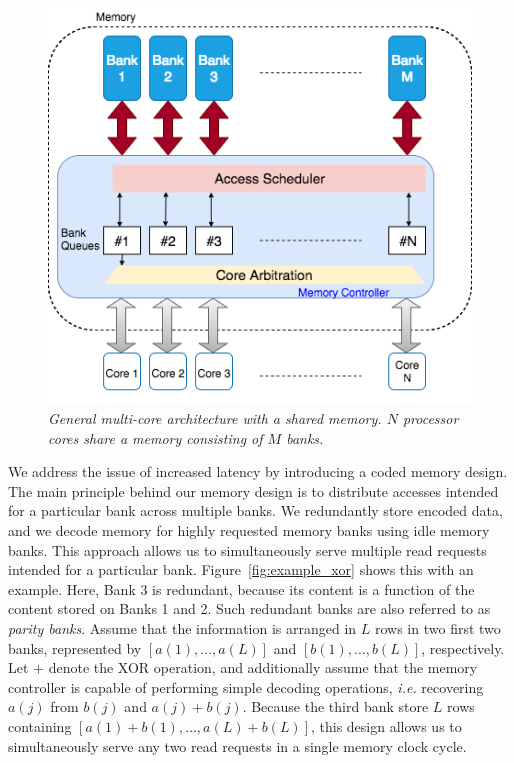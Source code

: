 \begin{figure}[t!]
\centering
\includegraphics[width=\linewidth]{fig/fig-2-memory-controller.png}
\caption{\it{General multi-core architecture with a shared memory. $N$ processor cores share a memory consisting of $M$ banks.}}
\label{fig:multicore_arch}
\end{figure}
We address the issue of increased latency by introducing a coded memory design. The main principle behind our memory design is to distribute accesses intended for a particular bank across multiple banks. We redundantly store encoded data, and we decode memory for highly requested memory banks using idle memory banks. This approach allows us to simultaneously serve multiple read requests intended for a particular bank. Figure~\ref{fig:example_xor} shows this with an example. Here, Bank 3 is redundant, because its content is a function of the content stored on Banks 1 and 2. Such redundant banks are also referred to as {\em parity banks}. Assume that the information is arranged in $L$ rows in two first two banks, represented by $[a(1),\ldots, a(L)]$ and $[b(1),\ldots, b(L)]$, respectively. Let $+$ denote the XOR operation, and additionally assume that the memory controller is capable of performing simple decoding operations, \textit{i.e.} recovering $a(j)$ from $b(j)$ and $a(j) + b(j)$. Because the third bank store $L$ rows containing $[a(1) + b(1),\ldots, a(L) + b(L)]$, this design allows us to simultaneously serve any two read requests in a single memory clock cycle.   

